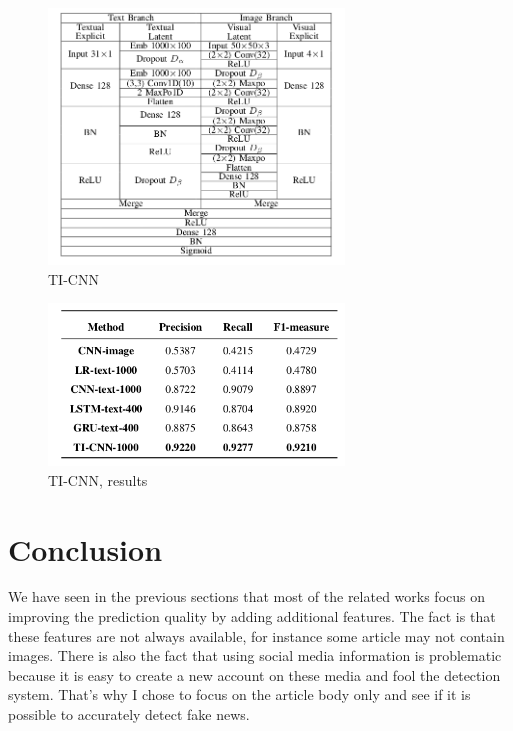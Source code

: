 \begin{figure}[h]
 \centering
 \includegraphics[width=0.7\textwidth]{images/chap1_bis/rev8.png}
 \caption{TI-CNN }
 \label{fig:chap1:yang2}
\end{figure}
\begin{figure}[h]
 \centering
 \includegraphics[width=0.7\textwidth]{images/chap1_bis/rev9.png}
 \caption{TI-CNN, results }
 \label{fig:chap1:yang3}
\end{figure}

\section{Conclusion}
We have seen in the previous sections that most of the related works focus on improving the prediction quality by adding additional features. The fact is that these features are not always available, for instance some article may not contain images. There is also the fact that using social media information is problematic because it is easy to create a new account on these media and fool the detection system. That's why I chose to focus on the article body only and see if it is possible to accurately detect fake news. 